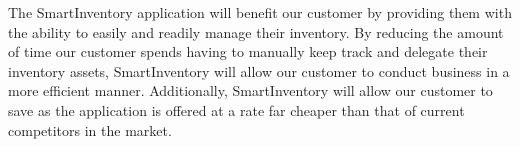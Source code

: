 

The SmartInventory application will benefit our customer by providing them with the ability to easily and readily manage their inventory. By reducing the amount of time our customer spends having to manually keep track and delegate their inventory assets, SmartInventory will allow our customer to conduct business in a more efficient manner. Additionally, SmartInventory will allow our customer to save as the application is offered at a rate far cheaper than that of current competitors in the market.